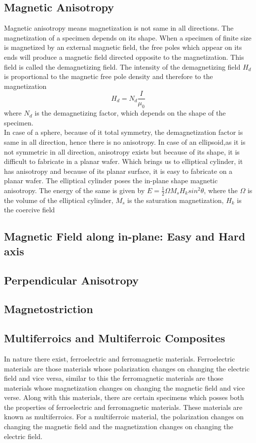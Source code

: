 \subsection{Magnetic Anisotropy}
Magnetic anisotropy means magnetization is not same in all directions. The magnetization of a specimen depends on its shape. When a specimen of finite size is magnetized by an external magnetic field, the free poles which appear on its ends will produce a magnetic field directed opposite to the magnetization. This field is called the demagnetizing field. The intensity of the demagnetizing field $H_d$ is proportional to the magnetic free pole density and therefore to the magnetization
\[H_d=N_d\frac{I}{\mu_0}\]
where $N_d$ is the demagnetizing factor, which depends on the shape of the specimen.\\
In case of a sphere, because of it total symmetry, the demagnetization factor is same in all direction, hence there is no anisotropy.
In case of an ellipsoid,as it is not symmetric in all direction, anisotropy exists but because of its shape, it is difficult to fabricate in a planar wafer.
Which brings us to elliptical cylinder, it has anisotropy and because of its planar surface, it is easy to fabricate on a planar wafer. The elliptical cylinder poses the in-plane shape magnetic anisotropy. The energy of the same is given by $E=\frac{1}{2}\Omega M_s H_k sin^2 \theta$, where the $\Omega$ is the volume of the elliptical cylinder, $M_s$ is the saturation magnetization, $H_k$ is the coercive field

\subsection{Magnetic Field along in-plane: Easy and Hard axis}
\subsection{Perpendicular Anisotropy}
\subsection{Magnetostriction}
\subsection{Multiferroics and Multiferroic Composites}
In nature there exist, ferroelectric and ferromagnetic materials. Ferroelectric materials are those materials whose polarization changes on changing the electric field and vice versa, similar to this the ferromagnetic materials are those materials whose magnetization changes on changing the magnetic field and vice verse. Along with this materials, there are certain specimens which posses both the properties of ferroelectric and ferromagnetic materials. These materials are known as multiferroics. For a multiferroic material, the polarization changes on changing the magnetic field and the magnetization changes on changing the electric field.   
